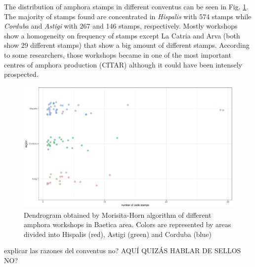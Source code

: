 \documentclass[review]{elsarticle}
\begin{document}
The distribution of amphora stamps in different conventus can be seen in Fig. \ref{frequency}. The majority of stamps found are concentrated in \textit{Hispalis} with 574 stamps while \textit{Corduba} and \textit{Astigi} with 267 and 146 stamps, respectively. Mostly workshops show a homogeneity on frequency of stamps except La Catria and Arva (both show 29 different stamps) that show a big amount of different stamps. According to some researchers, those workshops became in one of the most important centres of amphora production (CITAR) although it could have been intensely prospected. \citep{arva_1997}
 
\begin{figure}[htp]
	\centering
\includegraphics[width=\linewidth]{figs/frequency}
\caption{Dendrogram obtained by Morisita-Horn algorithm of different amphora workshops in Baetica area. Colors are represented by areas divided into Hispalis (red), Astigi (green) and Corduba (blue)}
\label{frequency}
\end{figure} 

explicar las razones del conventus no?
AQUÍ QUIZÁS HABLAR DE SELLOS NO?



\end{document}
